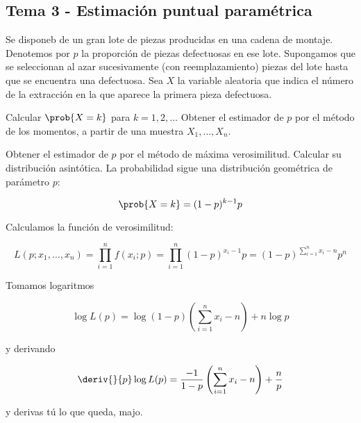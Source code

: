 \subsection{Tema 3 - Estimación puntual paramétrica}

\begin{problem}[3] Se disponeb de un gran lote de piezas producidas en una cadena de montaje. Denotemos por $p$ la proporción de piezas defectuosas en ese lote. Supongamos que se seleccionan al azar sucesivamente (con reemplazamiento) piezas del lote hasta que se encuentra una defectuosa. Sea $X$ la variable aleatoria que indica el número de la extracción en la que aparece la primera pieza defectuosa.

\ppart Calcular $\prob{X=k}$ para $k=1,2,\dotsc$ Obtener el estimador de $p$ por el método de los momentos, a partir de una muestra $X_1,\dotsc , X_n$.

\ppart Obtener el estimador de $p$ por el método de máxima verosimilitud. Calcular su distribución asintótica.
\solution
\spart
La probabilidad sigue una distribución geométrica de parámetro $p$:

\[ \prob{X=k} = (1-p)^{k-1}p \]

\spart Calculamos la función de verosimilitud:

\[ L(p;x_1,\dotsc,x_n) = \prod_{i=1}^n f(x_i;p) = \prod_{i=1}^n (1-p)^{x_i -1}p = (1-p)^{\sum_{i=1}^n x_i -n} p^n \]

Tomamos logaritmos

\[ \log L(p) = \log(1-p) \left(\sum_{i=1}^n x_i -n\right) + n\log p \]

y derivando

\[ \deriv{}{p} \log L(p) = \frac{-1}{1-p} \left(\sum_{i=1}^n x_i -n\right)  + \frac{n}{p} \] 

y derivas tú lo que queda, majo.
\end{problem}

